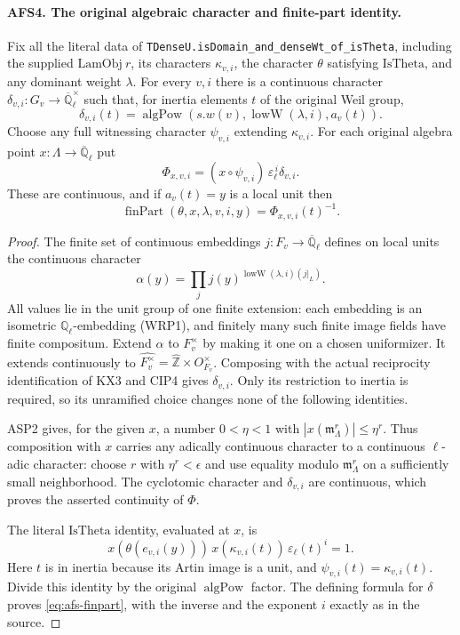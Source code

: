 \paragraph{AFS4. The original algebraic character and finite-part identity.}
\label{claim:AFS4}
Fix all the literal data of
\texttt{TDenseU.isDomain\_and\_denseWt\_of\_isTheta}, including
the supplied $\mathrm{LamObj}\ r$, its characters $\kappa_{v,i}$,
the character $\theta$ satisfying $\mathrm{IsTheta}$, and any
dominant weight $\lambda$.  For every $v,i$ there is a
continuous character $\delta_{v,i}:G_v\to
\overline{\mathbb Q}_\ell^{\times}$ such that, for inertia
elements $t$ of the original Weil group,
\[
 \delta_{v,i}(t)=
  \operatorname{algPow}(s.w(v),\operatorname{lowW}(\lambda,i),a_v(t)).
\]
Choose any full witnessing character $\psi_{v,i}$ extending
$\kappa_{v,i}$.  For each original algebra point
$x:\Lambda\to\overline{\mathbb Q}_\ell$ put
\[
 \Phi_{x,v,i}=(x\circ\psi_{v,i})\,
                     \varepsilon_\ell^{\,i}\delta_{v,i}.
\]
These are continuous, and if $a_v(t)=y$ is a local unit then
\begin{equation}\label{eq:afs-finpart}
 \operatorname{finPart}(\theta,x,\lambda,v,i,y)
                       =\Phi_{x,v,i}(t)^{-1}.
\end{equation}
\begin{proof}
The finite set of continuous embeddings
$j:F_v\to\overline{\mathbb Q}_\ell$ defines on local units
the continuous character
\[
 \alpha(y)=\prod_jj(y)^{
          \operatorname{lowW}(\lambda,i)(j|_L)}.
\]
All values lie in the unit group of one finite extension:
each embedding is an isometric $\mathbb Q_\ell$-embedding
(WRP1), and finitely many such finite image fields have finite
compositum.  Extend $\alpha$ to $F_v^{\times}$ by making it
one on a chosen uniformizer.  It extends continuously to
$\widehat{F_v^{\times}}=\widehat{\mathbb Z}\times O_{F_v}^{\times}$.
Composing with the actual reciprocity identification of KX3
and CIP4 gives $\delta_{v,i}$.  Only its restriction to inertia
is required, so its unramified choice changes none of the
following identities.

ASP2 gives, for the given $x$, a number $0<\eta<1$ with
$|x(\mathfrak m_\Lambda^r)|\leq\eta^r$.  Thus composition
with $x$ carries any adically continuous character to a
continuous $\ell$-adic character: choose $r$ with
$\eta^r<\epsilon$ and use equality modulo
$\mathfrak m_\Lambda^r$ on a sufficiently small neighborhood.
The cyclotomic character and $\delta_{v,i}$ are continuous,
which proves the asserted continuity of $\Phi$.

The literal $\mathrm{IsTheta}$ identity, evaluated at $x$, is
\[
 x(\theta(e_{v,i}(y)))\,x(\kappa_{v,i}(t))\,
                     \varepsilon_\ell(t)^i=1.
\]
Here $t$ is in inertia because its Artin image is a unit,
and $\psi_{v,i}(t)=\kappa_{v,i}(t)$.  Divide this identity by
the original $\operatorname{algPow}$ factor.  The defining
formula for $\delta$ proves \eqref{eq:afs-finpart}, with the
inverse and the exponent $i$ exactly as in the source.
\end{proof}

